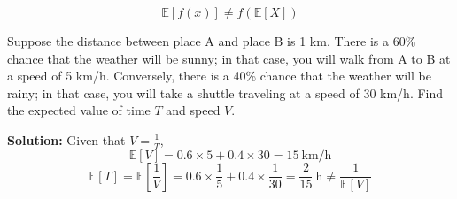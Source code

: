 \begin{remark}
  \[
    \mathbb{E}[f(x)] \neq f(\mathbb{E}[X])
  \]
\end{remark}
\begin{eg}
  Suppose the distance between place A and place B is 1 km. There is a 60\% chance that the weather will be sunny; in that case, you will walk from A to B at a speed of 5 km/h. Conversely, there is a 40\% chance that the weather will be rainy; in that case, you will take a shuttle traveling at a speed of 30 km/h. Find the expected value of time \(T\) and speed \(V\).

  \textbf{Solution:} 
  Given that \(V = \frac{1}{T}\),
  \[
    \mathbb{E}[V] = 0.6 \times 5 + 0.4 \times 30 = 15\ \text{km/h}
  \]
  \[
    \mathbb{E}[T] = \mathbb{E}[\frac{1}{V}] = 0.6 \times \frac{1}{5} + 0.4 \times \frac{1}{30} = \frac{2}{15}\ \text{h} \neq \dfrac{1}{\mathbb{E}[V]}
  \]
\end{eg}

